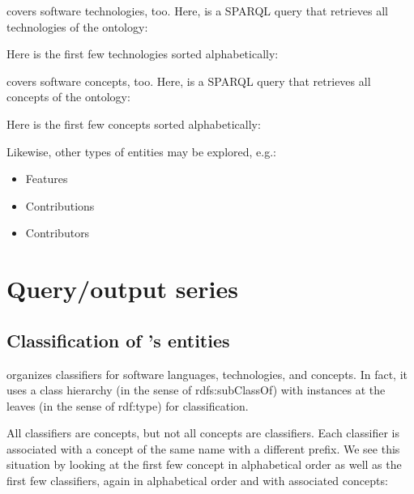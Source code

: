 \documentclass{llncs}
\begin{document}
\noindent
\solasote{} covers software technologies, too. Here, is a SPARQL query
that retrieves all technologies of the ontology:


\noindent
Here is the first few technologies sorted alphabetically:


\noindent
\solasote{} covers software concepts, too. Here, is a SPARQL query
that retrieves all concepts of the ontology:


\noindent
Here is the first few concepts sorted alphabetically:




Likewise, other types of entities may be explored, e.g.:

\begin{itemize}
\item Features
\item Contributions
\item Contributors
\end{itemize}



\section{Query/output series}


\subsection{Classification of \solasote's entities}

\solasote{} organizes classifiers for software languages,
technologies, and concepts. In fact, it uses a class hierarchy (in the
sense of rdfs:subClassOf) with instances at the leaves (in the sense
of rdf:type) for classification.

All classifiers are concepts, but not all concepts are
classifiers. Each classifier is associated with a concept of the same
name with a different prefix. We see this situation by looking at the
first few concept in alphabetical order as well as the first few
classifiers, again in alphabetical order and with associated concepts: 
\end{document}
